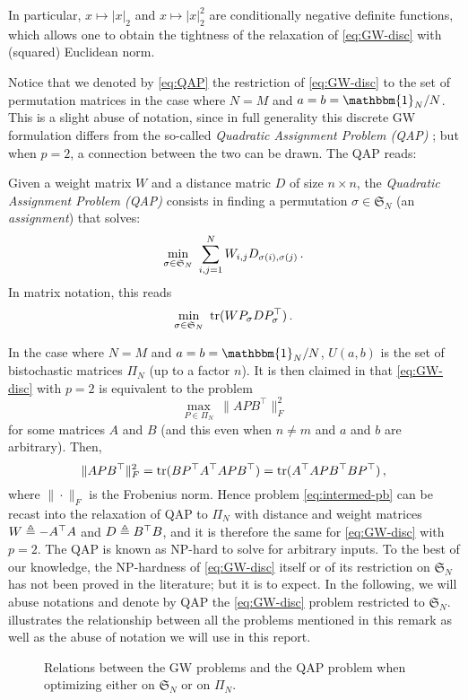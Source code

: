         In particular, $x\mapsto |x|_2$ and $x\mapsto |x|^2_2$ are conditionally negative definite functions, which allows one to obtain the tightness of the relaxation of \cref{eq:GW-disc} with (squared) Euclidean norm.
    \begin{remark}
        Notice that we denoted by \cref{eq:QAP} the restriction of \cref{eq:GW-disc} to the set of permutation matrices in the case where $N=M$ and $a=b=\mathbbm{1}_N/N$. This is a slight abuse of notation, since in full generality this discrete GW formulation differs from the so-called \emph{Quadratic Assignment Problem (QAP)} \cite{koopmans1957assignment}; but when $p=2$, a connection between the two can be drawn. The QAP reads:
        \begin{defi}
            Given a weight matrix $W$ and a distance matric $D$ of size $n\times n$, the \emph{Quadratic Assignment Problem (QAP)} consists in finding a permutation $\sigma\in \mathfrak S_N$ (an \emph{assignment}) that solves:
            \begin{equation}
                \label{eq:true-QAP}
                \min_{\sigma\in \mathfrak S_N}\ \sum_{i,j=1}^N W_{i,j} D_{\sigma(i), \sigma(j)}\,.
            \end{equation}
            In matrix notation, this reads $$\min _{\sigma \in \mathfrak S_N}\ \operatorname{tr}(W P_\sigma D P_\sigma^\top)\,.$$
        \end{defi}
    In the case where $N=M$ and $a=b=\mathbbm{1}_N/N$, $U(a,b)$ is the set of bistochastic matrices $\Pi_N$ (up to a factor $n$). It is then claimed in \cite{alvarez2019towards} that \cref{eq:GW-disc} with $p=2$ is equivalent to the problem
    \begin{equation}
        \label{eq:intermed-pb}
        \max_{P\in \Pi_N}\ \|APB^\top\|_{F}^{2}
    \end{equation}
    for some matrices $A$ and $B$ (and this even when $n\neq m$ and $a$ and $b$ are arbitrary). Then,
    $$\|APB^\top\|_{F}^{2}=\operatorname{tr}(BP^\top A^\top APB^\top)=\operatorname{tr}(A^\top APB^\top BP^\top)\,,$$
    where $\|\cdot\|_F$ is the Frobenius norm. Hence problem \cref{eq:intermed-pb} can be recast into the relaxation of QAP to $\Pi_N$ with distance and weight matrices $W\triangleq -A^\top A$ and $D \triangleq B^\top B$, and it is therefore the same for \cref{eq:GW-disc} with $p=2$.
    The QAP is known as NP-hard to solve for arbitrary inputs. To the best of our knowledge, the NP-hardness of \cref{eq:GW-disc} itself or of its restriction on $\mathfrak S_N$ has not been proved in the literature; but it is to expect. In the following, we will abuse notations and denote by QAP the \cref{eq:GW-disc} problem restricted to $\mathfrak S_N$.  illustrates the relationship between all the problems mentioned in this remark as well as the abuse of notation we will use in this report.
    \end{remark}
        \begin{figure}[!h]
            \centering
            
            \caption{Relations between the GW problems and the QAP problem when optimizing either on $\mathfrak S_N$ or on $\Pi_N$.}
            \label{fig:qap-relaxations}
        \end{figure}

